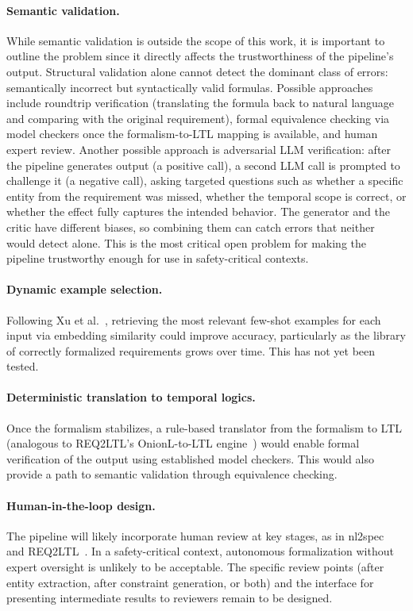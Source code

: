 \paragraph{Semantic validation.}
While semantic validation is outside the scope of this work, it is
important to outline the problem since it directly affects the
trustworthiness of the pipeline's output.
Structural validation alone cannot detect the dominant class of errors:
semantically incorrect but syntactically valid formulas. Possible
approaches include roundtrip verification (translating the formula back
to natural language and comparing with the original requirement), formal
equivalence checking via model checkers once the formalism-to-LTL
mapping is available, and human expert review. Another possible approach
is adversarial LLM verification: after the pipeline generates output
(a positive call), a second LLM call is prompted to challenge it (a
negative call), asking targeted questions such as whether a specific
entity from the requirement was missed, whether the temporal scope is
correct, or whether the effect fully captures the intended behavior. The
generator and the critic have different biases, so combining them can
catch errors that neither would detect alone. This is the most critical
open problem for making the pipeline trustworthy enough for use in
safety-critical contexts.

\paragraph{Dynamic example selection.}
Following Xu et al.~\cite{xu2024nl2ltl}, retrieving the most relevant
few-shot examples for each input via embedding similarity could improve
accuracy, particularly as the library of correctly formalized
requirements grows over time. This has not yet been tested.

\paragraph{Deterministic translation to temporal logics.}
Once the formalism stabilizes, a rule-based translator from the
formalism to LTL (analogous to REQ2LTL's OnionL-to-LTL
engine~\cite{ma2025req2ltl}) would enable formal verification of the
output using established model checkers. This would also provide a path
to semantic validation through equivalence checking.

\paragraph{Human-in-the-loop design.}
The pipeline will likely incorporate human review at key stages, as in
nl2spec~\cite{cosler2023nl2spec} and
REQ2LTL~\cite{ma2025req2ltl}. In a safety-critical context, autonomous
formalization without expert oversight is unlikely to be acceptable. The
specific review points (after entity extraction, after constraint
generation, or both) and the interface for presenting intermediate
results to reviewers remain to be designed.


